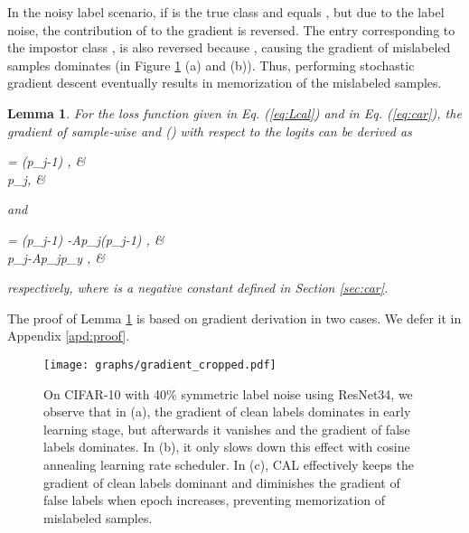 \documentclass{article}
\newtheorem{lemma}{Lemma}
\begin{document}
In the noisy label scenario, if  is the true class and equals , but  due to the label noise, the contribution of  to the gradient is reversed. The entry corresponding to the impostor class , is also reversed because , causing the gradient of mislabeled samples dominates (in Figure \ref{fig:gradient} (a) and (b)). Thus, performing stochastic gradient descent eventually results in memorization of the mislabeled samples. 


\begin{lemma}
	\label{lamma1}
	For the loss function  given in Eq. (\ref{eq:Lcal}) and  in Eq. (\ref{eq:car}), the gradient of sample-wise  and  () with respect to the logits  can be derived as
	\begin{subnumcases}{\label{eq:dcal} =}
		(p_{j}-1) , &  \label{eq:dcal_isj} \\
		p_{j}, &   \label{eq:dcal_isnotj}
	\end{subnumcases}
and
	\begin{subnumcases}{\label{eq:dcar} =}
		(p_{j}-1) -A\tau p_{j}(p_{j}-1) , &  \label{eq:dcar_isj}\\
		p_{j}-A\tau p_{j}p_{y}  , &  \label{eq:dcar_isnotj}
	\end{subnumcases}
respectively, where  is a negative constant defined in Section \ref{sec:car}.
\end{lemma}

The proof of Lemma \ref{lamma1} is based on gradient derivation in two cases. We defer it in Appendix \ref{apd:proof}.



\begin{figure}[t]
	\begin{center}
		\texttt{[image: graphs/gradient\_cropped.pdf]}
	\end{center}
	\caption{On CIFAR-10 with 40\% symmetric label noise using ResNet34, we observe that in (a),  the gradient of clean labels dominates in early learning stage, but afterwards it vanishes and the gradient of false labels dominates. In (b), it only slows down this effect with cosine annealing learning rate scheduler. In (c), CAL effectively keeps the gradient of clean labels dominant and diminishes the gradient of false labels when epoch increases, preventing memorization of mislabeled samples.}
\label{fig:gradient}
\end{figure}
\end{document}
